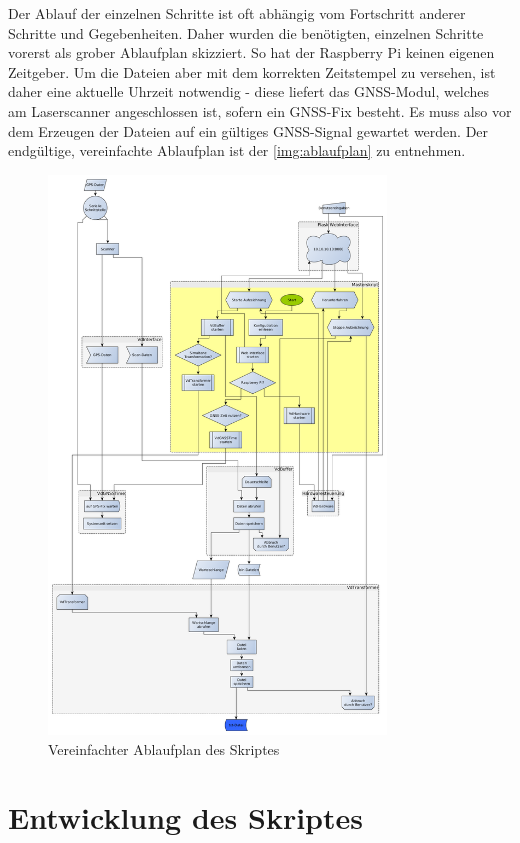 \documentclass[a4paper,12pt,bibliography=totoc, listof=totoc,titlepage,pointlessnumbers]{scrreprt}
\begin{document}
Der Ablauf der einzelnen Schritte ist oft abhängig vom Fortschritt anderer Schritte und Gegebenheiten. Daher wurden die benötigten, einzelnen Schritte vorerst als grober Ablaufplan skizziert. So hat der Raspberry Pi keinen eigenen Zeitgeber. Um die Dateien aber mit dem korrekten Zeitstempel zu versehen, ist daher eine aktuelle Uhrzeit notwendig - diese liefert das GNSS-Modul, welches am Laser\-scan\-ner angeschlossen ist, sofern ein GNSS-Fix besteht. Es muss also vor dem Erzeugen der Dateien auf ein gültiges GNSS-Signal gewartet werden. Der endgültige, vereinfachte Ablaufplan ist der \autoref{img:ablaufplan} zu entnehmen. 
\begin{figure}
 \centering
 \includegraphics[width=0.8\textwidth]{./img/Ablaufplan.png}
 \caption{Vereinfachter Ablaufplan des Skriptes}
 \label{img:ablaufplan}
\end{figure}

\chapter{Entwicklung des Skriptes}
\label{c:skript}
\nocite{oopPython}
\nocite{uml}
\nocite{flask}
\end{document}
